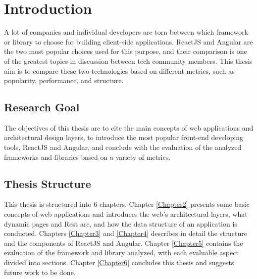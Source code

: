 
\chapter{Introduction} %

\label{Chapter1} %

A lot of companies and individual developers are torn between which framework or library to choose for building client-side applications. ReactJS and Angular are the two most popular choices used for this purpose, and their comparison is one of the greatest topics in discussion between tech community members. This thesis aim is to compare these two technologies based on different metrics, such as popularity, performance, and structure. \par

\section{Research Goal}
The objectives of this thesis are to cite the main concepts of web applications and architectural design layers, to introduce the most popular front-end developing tools, ReactJS and Angular, and conclude with the evaluation of the analyzed frameworks and libraries based on a variety of metrics. \par

\section{Thesis Structure}
This thesis is structured into 6 chapters. Chapter \ref{Chapter2} presents some basic concepts of web applications and introduces the web’s architectural layers, what dynamic pages and Rest are, and how the data structure of an application is conducted. Chapters \ref{Chapter3} and \ref{Chapter4} describes in detail the structure and the components of ReactJS and Angular. Chapter \ref{Chapter5} contains the evaluation of the framework and library analyzed, with each evaluable aspect divided into sections. Chapter \ref{Chapter6} concludes this thesis and suggests future work to be done.
